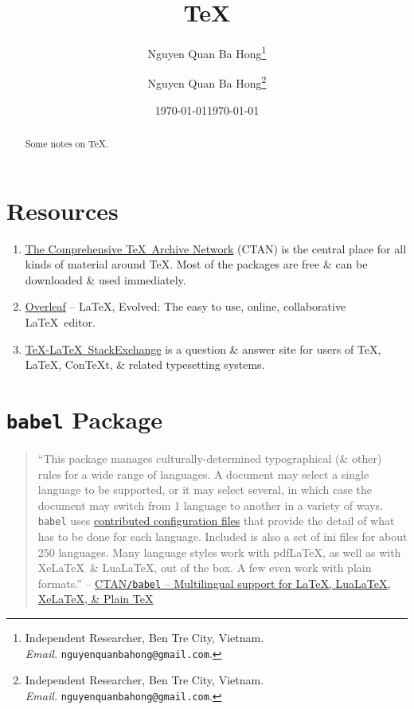 \documentclass{article}
\title{}
\author{Nguyen Quan Ba Hong\footnote{Independent Researcher, Ben Tre City, Vietnam.\\\textit{Email.} \texttt{nguyenquanbahong@gmail.com}.}}
\date{\today}
\title{\TeX}
\author{Nguyen Quan Ba Hong\footnote{Independent Researcher, Ben Tre City, Vietnam.\\\textit{Email.} \texttt{nguyenquanbahong@gmail.com}.}}
\date{\today}
\numberwithin{equation}{section}
\begin{document}
\maketitle
\begin{abstract}
	Some notes on \TeX.
\end{abstract}
\tableofcontents


\section{Resources}

\begin{enumerate}
	\item \href{https://ctan.org/}{The Comprehensive \TeX\ Archive Network} (CTAN) is the central place for all kinds of material around \TeX. Most of the packages are free \& can be downloaded \& used immediately.
	\item \href{https://www.overleaf.com/}{Overleaf} -- \LaTeX, Evolved: The easy to use, online, collaborative \LaTeX\ editor.
	\item \href{https://tex.stackexchange.com/}{\TeX-\LaTeX\ StackExchange} is a question \& answer site for users of \TeX, \LaTeX, ConTeXt, \& related typesetting systems.
\end{enumerate}


\section{\texttt{babel} Package}
\begin{quotation}
	``This package manages culturally-determined typographical (\& other) rules for a wide range of languages. A document may select a single language to be supported, or it may select several, in which case the document may switch from 1 language to another in a variety of ways. \texttt{babel} uses \href{https://ctan.org/pkg/babel-contrib}{contributed configuration files} that provide the detail of what has to be done for each language. Included is also a set of ini files for about 250 languages. Many language styles work with pdf\LaTeX, as well as with Xe\LaTeX\ \& Lua\LaTeX, out of the box. A few even work with plain formats.'' -- \href{https://ctan.org/pkg/babel}{CTAN\texttt{/}\texttt{babel} -- Multilingual support for \LaTeX, Lua\LaTeX, Xe\LaTeX, \& Plain \TeX}
\end{quotation}
\end{document}
